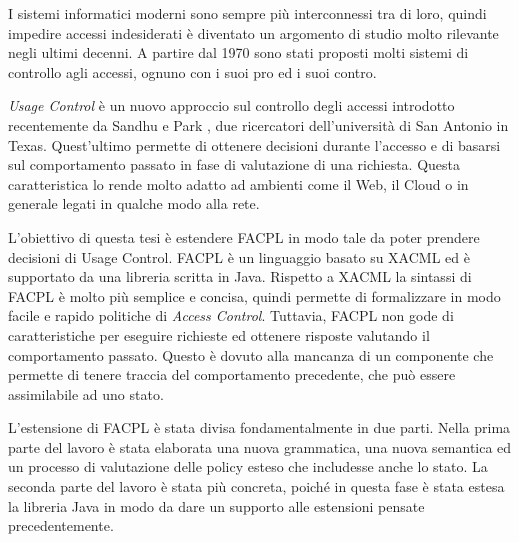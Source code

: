 I sistemi informatici moderni sono sempre più interconnessi tra di loro, quindi
impedire accessi indesiderati è diventato un argomento di studio molto rilevante negli ultimi decenni.
A partire dal 1970 sono stati proposti molti sistemi di controllo agli accessi, ognuno con i suoi pro ed i suoi contro.\par
\textit{Usage Control} è un nuovo approccio sul controllo degli accessi
introdotto recentemente da Sandhu e Park \cite{ucon}, due ricercatori dell'università di San Antonio in Texas.
Quest'ultimo permette di ottenere decisioni durante
l’accesso e di basarsi sul comportamento passato in fase di valutazione
di una richiesta. Questa caratteristica lo rende molto adatto ad ambienti come il Web,
il Cloud o in generale legati in qualche modo alla rete. \par
L'obiettivo di questa tesi è estendere \ac{FACPL} in modo tale da poter prendere decisioni 
di Usage Control.
\ac{FACPL} è un linguaggio basato su \ac{XACML} ed è supportato da una libreria
scritta in Java. Rispetto a \ac{XACML} la sintassi di \ac{FACPL} è molto più semplice
e concisa, quindi permette di formalizzare in modo facile e rapido
politiche di \textit{Access Control}. 
Tuttavia, \ac{FACPL} non gode di caratteristiche
per eseguire richieste ed ottenere risposte valutando il comportamento passato. Questo è dovuto alla mancanza di un componente che permette di tenere traccia del comportamento precedente, che può essere assimilabile ad uno stato.\par
L'estensione di \ac{FACPL} è stata divisa fondamentalmente in due parti. 
Nella prima parte del lavoro è stata elaborata una nuova grammatica, una nuova semantica ed un processo di valutazione delle policy esteso che includesse anche lo stato.
La seconda parte del lavoro è stata più concreta, poiché in questa fase è stata estesa la libreria Java in modo da dare un supporto alle estensioni pensate precedentemente. \par



